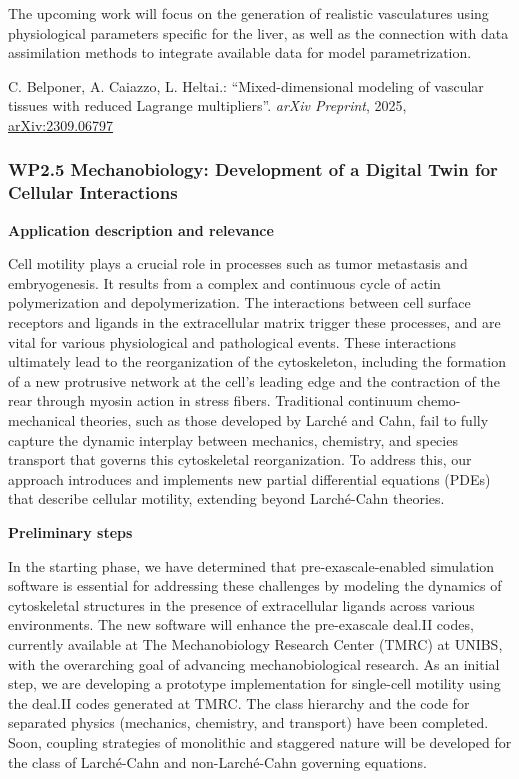 \documentclass[a4paper,12pt, numbers]{article}
\begin{document}
The upcoming work will focus on the generation of realistic vasculatures using physiological parameters specific for the liver, as well as the connection with data assimilation methods to integrate available data for model parametrization.


\begin{thebibliography}{10}
 C. Belponer, A. Caiazzo, L. Heltai.: ``Mixed-dimensional modeling of vascular tissues with reduced Lagrange multipliers''. \emph{arXiv Preprint}, 2025, \href{https://arxiv.org/abs/2309.06797}{arXiv:2309.06797}
\end{thebibliography}


\subsubsection*{WP2.5 Mechanobiology: Development of a Digital Twin for Cellular Interactions}

\noindent\textbf{Application description and relevance}

Cell motility plays a crucial role in processes such as tumor metastasis and embryogenesis.
It results from a complex and continuous cycle of actin polymerization and depolymerization.
The interactions between cell surface receptors and ligands in the extracellular matrix trigger these processes, and are vital for various physiological and pathological events.
These interactions ultimately lead to the reorganization of the cytoskeleton, including the formation of a new protrusive network at the cell's leading edge and the contraction of the rear through myosin action in stress fibers.
Traditional continuum chemo-mechanical theories, such as those developed by Larché and Cahn, fail to fully capture the dynamic interplay between mechanics, chemistry, and species transport that governs this cytoskeletal reorganization.
To address this, our approach introduces and implements new partial differential equations (PDEs) that describe cellular motility, extending beyond Larché-Cahn theories.

\noindent\textbf{Preliminary steps}

In the starting phase, we have determined that pre-exascale-enabled simulation software is essential for addressing these challenges by modeling the dynamics of cytoskeletal structures in the presence of extracellular ligands across various environments. The new software will enhance the pre-exascale deal.II codes, currently available at The Mechanobiology Research Center (TMRC) at UNIBS, with the overarching goal of advancing mechanobiological research.
As an initial step, we are developing a prototype implementation for single-cell motility using the deal.II codes generated at TMRC. The class hierarchy and the code for separated physics (mechanics, chemistry, and transport) have been completed. Soon, coupling strategies of monolithic and staggered nature will be developed for the class of Larché-Cahn and non-Larché-Cahn governing equations.
\end{document}
